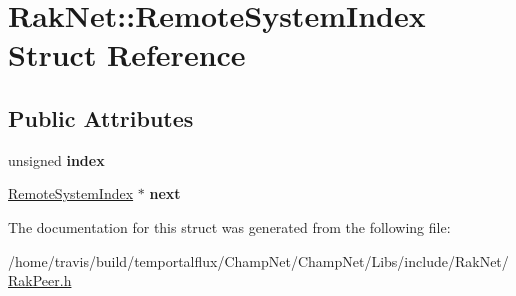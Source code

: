 \hypertarget{struct_rak_net_1_1_remote_system_index}{\section{Rak\-Net\-:\-:Remote\-System\-Index Struct Reference}
\label{struct_rak_net_1_1_remote_system_index}
}
\subsection*{Public Attributes}
\begin{DoxyCompactItemize}
\item 
\hypertarget{struct_rak_net_1_1_remote_system_index_a95bdab2ef83027077533866f94079750}{unsigned {\bfseries index}}\label{struct_rak_net_1_1_remote_system_index_a95bdab2ef83027077533866f94079750}

\item 
\hypertarget{struct_rak_net_1_1_remote_system_index_aa4ee9d55836b821f6eea0e569ea729f6}{\hyperlink{struct_rak_net_1_1_remote_system_index}{Remote\-System\-Index} $\ast$ {\bfseries next}}\label{struct_rak_net_1_1_remote_system_index_aa4ee9d55836b821f6eea0e569ea729f6}

\end{DoxyCompactItemize}


The documentation for this struct was generated from the following file\-:\begin{DoxyCompactItemize}
\item 
/home/travis/build/temportalflux/\-Champ\-Net/\-Champ\-Net/\-Libs/include/\-Rak\-Net/\hyperlink{_rak_peer_8h}{Rak\-Peer.\-h}\end{DoxyCompactItemize}
